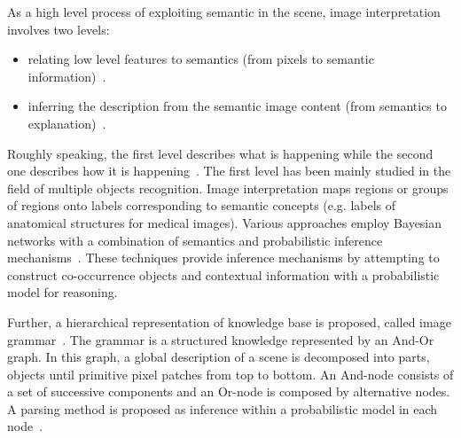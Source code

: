 \documentclass{article}
\begin{document}
As a high level process of exploiting semantic in the scene, image interpretation involves two levels:
\begin{itemize}
 \item relating low level features to semantics (from pixels to semantic information)~\cite{Bloch2005fuzzy,fouquier2012sequential,Hudelot2008fuzzy,nempont2013constraint}.
 \item inferring the description from the semantic image content (from semantics to explanation)~\cite{atif2014explanatory,Espinosa07multimedia}.
\end{itemize}

Roughly speaking, the first level describes what is happening while the second one describes how it is happening~\cite{tsotsos1992image}.
The first level has been mainly studied in the field of multiple objects recognition. 
Image interpretation maps regions or groups of regions onto labels corresponding to semantic concepts (e.g. labels of anatomical structures for medical images).
Various approaches employ Bayesian networks with a combination of semantics and probabilistic inference mechanisms~\cite{Luo2005Bayesian,Niko2009evidence,Singhal2003proba}.
These techniques provide inference mechanisms by attempting to construct co-occurrence objects and contextual information with a probabilistic model for reasoning.

Further, a hierarchical representation of knowledge base is proposed, called image grammar~\cite{tu2014joint,zhu2006stochastic}. The grammar is a structured knowledge represented by an And-Or graph.
In this graph, a global description of a scene is decomposed into parts, objects until primitive pixel patches from top to bottom.
An And-node consists of a set of successive components and an Or-node is composed by alternative nodes.
A parsing method is proposed as inference within a probabilistic model in each node~\cite{han2009bottom,wu2011numerical}. 
\end{document}
